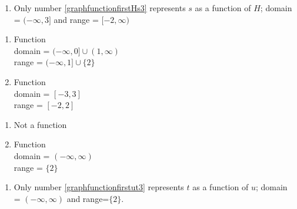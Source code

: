 \documentclass{ximera}
\begin{document}
\begin{enumerate}

\item Only number \ref{graphfunctionfirstHs3} represents $s$ as a function of $H$;  domain =  $(-\infty, 3]$  and range =   $[-2, \infty)$


\end{enumerate}



\begin{enumerate}

\item  Function \\  domain =  $(-\infty, 0] \cup (1, \infty)$ \\ range =  $(-\infty, 1] \cup \{ 2\}$

 

 

\item  Function \\  domain =  $[-3,3]$ \\ range =  $[-2,2]$

\end{enumerate}



\begin{enumerate}

\item   Not a function

 

 

\item  Function \\ domain = $(-\infty, \infty)$ \\ range = $\{2\}$

\end{enumerate}



\begin{enumerate}

\item  Only number \ref{graphfunctionfirstut3} represents $t$ as a function of $u$;  domain = $(-\infty, \infty)$ and range=$\{2 \}$.

\end{enumerate}
\end{document}
